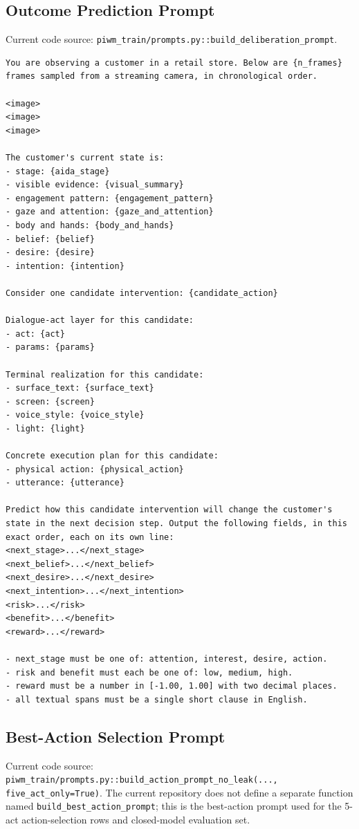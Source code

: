 \subsection{Outcome Prediction Prompt}
\label{app:prompt_outcome}

Current code source: \texttt{piwm\_train/prompts.py::build\_deliberation\_prompt}.

\begin{verbatim}
You are observing a customer in a retail store. Below are {n_frames} frames sampled from a streaming camera, in chronological order.

<image>
<image>
<image>

The customer's current state is:
- stage: {aida_stage}
- visible evidence: {visual_summary}
- engagement pattern: {engagement_pattern}
- gaze and attention: {gaze_and_attention}
- body and hands: {body_and_hands}
- belief: {belief}
- desire: {desire}
- intention: {intention}

Consider one candidate intervention: {candidate_action}

Dialogue-act layer for this candidate:
- act: {act}
- params: {params}

Terminal realization for this candidate:
- surface_text: {surface_text}
- screen: {screen}
- voice_style: {voice_style}
- light: {light}

Concrete execution plan for this candidate:
- physical action: {physical_action}
- utterance: {utterance}

Predict how this candidate intervention will change the customer's state in the next decision step. Output the following fields, in this exact order, each on its own line:
<next_stage>...</next_stage>
<next_belief>...</next_belief>
<next_desire>...</next_desire>
<next_intention>...</next_intention>
<risk>...</risk>
<benefit>...</benefit>
<reward>...</reward>

- next_stage must be one of: attention, interest, desire, action.
- risk and benefit must each be one of: low, medium, high.
- reward must be a number in [-1.00, 1.00] with two decimal places.
- all textual spans must be a single short clause in English.
\end{verbatim}

\subsection{Best-Action Selection Prompt}
\label{app:prompt_action}

Current code source: \texttt{piwm\_train/prompts.py::build\_action\_prompt\_no\_leak(..., five\_act\_only=True)}. The current repository does not define a separate function named \texttt{build\_best\_action\_prompt}; this is the best-action prompt used for the 5-act action-selection rows and closed-model evaluation set.

